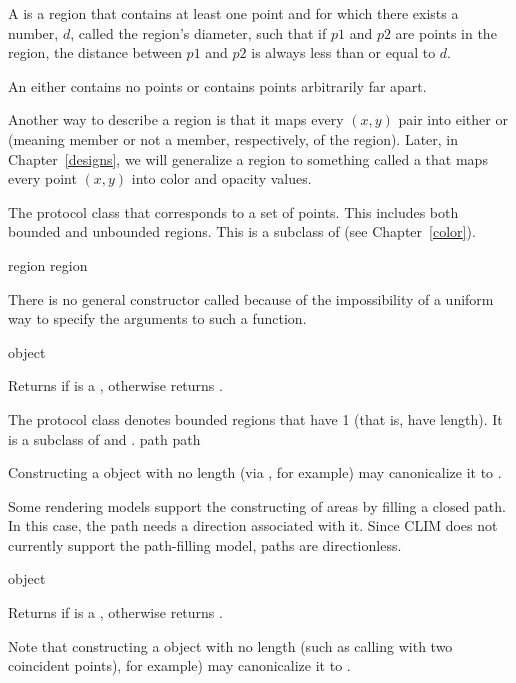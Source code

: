 A  is a region that contains at least one point and for
which there exists a number, $d$, called the region's diameter, such that if
$p1$ and $p2$ are points in the region, the distance between $p1$ and $p2$ is
always less than or equal to $d$.

An  either contains no points or contains points
arbitrarily far apart.

Another way to describe a region is that it maps every $(x,y)$ pair into either
 or  (meaning member or not a member, respectively, of
the region).  Later, in Chapter~\ref{designs}, we will generalize a region to
something called a  that maps every point $(x,y)$ into color and
opacity values.


The protocol class that corresponds to a set of points.  This includes both
bounded and unbounded regions.  This is a subclass of  (see
Chapter~\ref{color}).

 {region} {region}

There is no general constructor called  because of the
impossibility of a uniform way to specify the arguments to such a function.

 {object}

Returns  if  is a , otherwise returns
.


The protocol class  denotes bounded regions that have
 1 (that is, have length).  It is a subclass of
 and .
 {path} {path}

Constructing a  object with no length (via , for
example) may canonicalize it to .

Some rendering models support the constructing of areas by filling a closed
path.  In this case, the path needs a direction associated with it.  Since CLIM
does not currently support the path-filling model, paths are directionless.

 {object}

Returns  if  is a , otherwise returns
.

Note that constructing a  object with no length (such as calling
 with two coincident points), for example) may canonicalize it to
.

